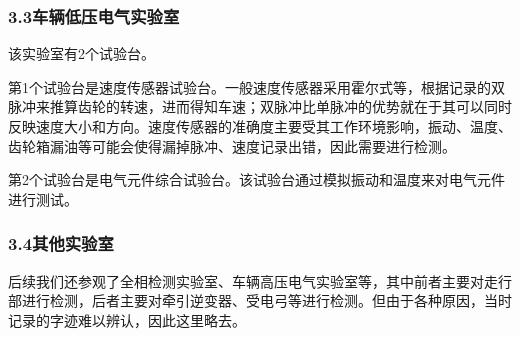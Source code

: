 \documentclass[12pt, oneside, a4paper]{ctexart}
\begin{document}
\newpage
\journalpage\par{}
\vspace{-5mm}\subsubsection*{3.3\quad{}车辆低压电气实验室}\vspace{-2mm}
该实验室有2个试验台。\par{}
第1个试验台是速度传感器试验台。一般速度传感器采用霍尔式等，根据记录的双脉冲来推算齿轮的转速，进而得知车速；双脉冲比单脉冲的优势就在于其可以同时反映速度大小和方向。速度传感器的准确度主要受其工作环境影响，振动、温度、齿轮箱漏油等可能会使得漏掉脉冲、速度记录出错，因此需要进行检测。\par{}
第2个试验台是电气元件综合试验台。该试验台通过模拟振动和温度来对电气元件进行测试。\par{}
\vspace{-5mm}\subsubsection*{3.4\quad{}其他实验室}\vspace{-2mm}
后续我们还参观了全相检测实验室、车辆高压电气实验室等，其中前者主要对走行部进行检测，后者主要对牵引逆变器、受电弓等进行检测。但由于各种原因，当时记录的字迹难以辨认，因此这里略去。\par{}

\newpage
\journalpage
\vspace{-7.5mm}
\hypertarget{journal-day-0715}{}
\end{document}
